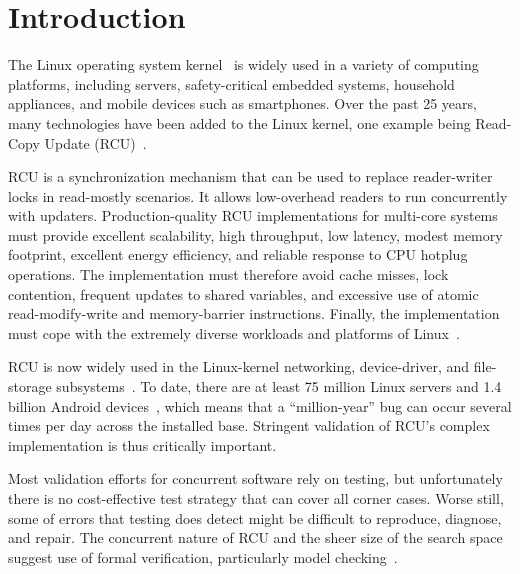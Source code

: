\section{Introduction}
The Linux operating system kernel~\cite{LinuxKernel} is widely used 
in a variety of computing platforms, including servers, safety-critical 
embedded systems, household appliances, and mobile devices such as 
smartphones. Over the past 25 years, many technologies 
have been added to the Linux kernel, one example being Read-Copy 
Update (RCU)~\cite{McKenneyRCU98}.

RCU is a synchronization mechanism that can be used to replace reader-writer 
locks in read-mostly scenarios. It allows low-overhead readers
to run concurrently with updaters. Production-quality RCU implementations 
for multi-core systems must provide excellent scalability, 
high throughput, low latency, modest memory footprint, excellent energy 
efficiency, and reliable response to CPU hotplug operations.
The implementation must therefore avoid cache misses, lock contention, 
frequent updates to shared variables, and excessive 
use of atomic read-modify-write and memory-barrier instructions.
Finally, the implementation must cope with the extremely diverse
workloads and platforms of Linux~\cite{McKenneyOSR08}.

RCU is now widely used in the Linux-kernel networking, device-driver, and
file-storage
subsystems~\cite{McKenneyOSR08,McKenneyRCUsageReport13}.
To date, there are at least 75 million Linux servers \cite{LinuxServerNum13} 
and 1.4 billion Android devices~\cite{AndroidNum15},
which means that a ``million-year'' bug
can occur several times per day across the installed base.
Stringent validation of RCU's complex implementation is thus critically
important.

Most validation efforts for concurrent software rely on testing, but
unfortunately there is no cost-effective test strategy that can cover
all corner cases. %
Worse still, some of errors that testing does detect might be difficult to 
reproduce, diagnose, and repair. The concurrent nature of RCU and the sheer 
size of the search space suggest use of formal verification, particularly
model checking~\cite{BurchInfComput92}.

